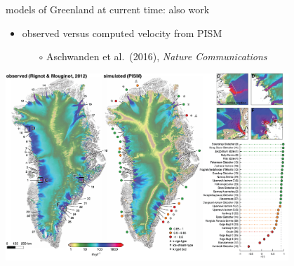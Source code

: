 \documentclass[10pt,hyperref={pdfpagelabels=true}]{beamer}
\begin{document}
\begin{frame}{models of Greenland at current time: also work}

\begin{itemize}
\item observed versus computed velocity from PISM
    \begin{itemize}
    \item[$\circ$] Aschwanden et al.~(2016), \emph{Nature Communications}    
    \end{itemize}
\end{itemize}

\medskip

\qquad\qquad \includegraphics[width=0.8\textwidth]{greenland-overview-3}
\end{frame}
\end{document}
